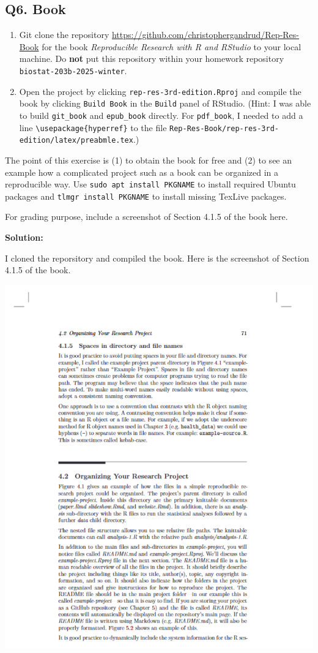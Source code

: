 \documentclass[
]{article}
\begin{document}
\hypertarget{q6.-book}{%
\subsection{Q6. Book}\label{q6.-book}}

\begin{enumerate}
\def\labelenumi{\arabic{enumi}.}
\item
  Git clone the repository
  \url{https://github.com/christophergandrud/Rep-Res-Book} for the book
  \emph{Reproducible Research with R and RStudio} to your local machine.
  Do \textbf{not} put this repository within your homework repository
  \texttt{biostat-203b-2025-winter}.
\item
  Open the project by clicking \texttt{rep-res-3rd-edition.Rproj} and
  compile the book by clicking \texttt{Build\ Book} in the
  \texttt{Build} panel of RStudio. (Hint: I was able to build
  \texttt{git\_book} and \texttt{epub\_book} directly. For
  \texttt{pdf\_book}, I needed to add a line
  \texttt{\textbackslash{}usepackage\{hyperref\}} to the file
  \texttt{Rep-Res-Book/rep-res-3rd-edition/latex/preabmle.tex}.)
\end{enumerate}

The point of this exercise is (1) to obtain the book for free and (2) to
see an example how a complicated project such as a book can be organized
in a reproducible way. Use \texttt{sudo\ apt\ install\ PKGNAME} to
install required Ubuntu packages and \texttt{tlmgr\ install\ PKGNAME} to
install missing TexLive packages.

For grading purpose, include a screenshot of Section 4.1.5 of the book
here.

\textbf{Solution:}

I cloned the reporsitory and compiled the book. Here is the screenshot
of Section 4.1.5 of the book.

\includegraphics{images/clipboard-3489899846.png}
\end{document}
